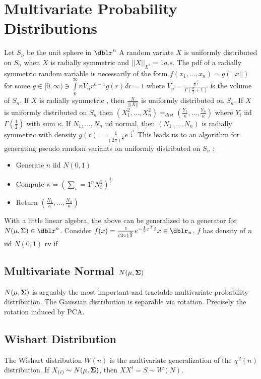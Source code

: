 \section*{Multivariate Probability Distributions}

Let $S_n$ be the unit sphere in $\dblr^n$ A random variate $X$
is uniformly distributed on $S_n$ when $X$ is radially
symmetric and $||X||_{L^2} = 1 a.s.$  The pdf of a radially
symmetric random variable is necessarily of the form
$f(x_1,...,x_n)=g(||x||)$ for some $g \in [0,\infty) \ni
\int\limits_{0}^{\infty} n V_n r^{n-1} g(r) dr =1$ where
$V_n=\frac{\pi^{\frac{d}{2}}}{\Gamma(\frac{d}{2}+1) }$ is the
volume of $S_n$. If $X$ is radially symmetric , then
$\frac{X}{|||X||}$ is uniformly distributed on $S_n$.  If $X$
is uniformly distributed on $S_n$ then $(X_1^2, \ldots ,
X_{n}^{2}) =_{dist} (\frac{Y_1}{\kappa} , \ldots ,
\frac{Y_n}{\kappa} )$ where $Y_i$ iid $\Gamma(\frac{1}{2})$
with sum $\kappa$.  If $N_1, \ldots , N_n$ iid normal, then
$(N_1, \ldots , N_n)$ is radially symmetric with density $g(r)
= \frac{1}{(2 \pi)^{\frac{n}{2} } } e^{\frac{ - r^2}{2}}$  This
leads us to an algorithm for generating pseudo random variants
on uniformly distributed on $S_n$ ;
\begin{itemize}
    \item Generate $n$ iid $N(0,1)$
    \item Compute $ \kappa = ( \sum\limits_i=1^n N_i^2
        )^\frac{1}{2}$
    \item Return $(\frac{N_1}{\kappa} , \ldots ,
        \frac{N_n}{\kappa} )$
\end{itemize}
\cite{Devorye}

With a little linear algebra, the above can be generalized to a
generator for $N(\mu, \Sigma ) \in \dblr^n$.  Consider $f(x)
=\frac{1}{(2 \pi)^{\frac{n}{2} } } e^{ - \frac{1}{2} x^T \dot x
} x \in \dblr_n$, $f$ has density of $n$ iid $N(0,1)$ rv if

\subsection{Multivariate Normal $N(\mathbf{\mu},\mathbf{\Sigma})$ }
$N(\mathbf{\mu},\mathbf{\Sigma})$ is arguably the most important and tractable multivariate probability distribution. The Gaussian distribution is separable via rotation.  Precisely the rotation induced by PCA.

\subsection{Wishart Distribution}
The Wishart distribution $W(n)$ is the multivariate generalization of the $\chi^2(n)$ distribution.  If $X_{(i)} \sim N(\mathbf{\mu},\mathbf{\Sigma})$, then
$X X^t =S \sim W(N)$.

